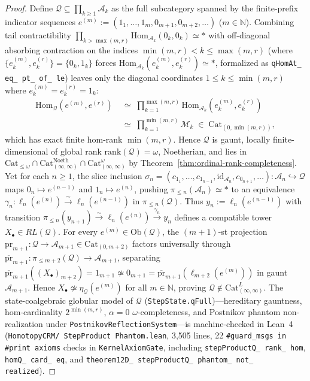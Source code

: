 \begin{proof}
Define $\mathcal{Q} \subseteq \prod_{k \ge 1} \mathcal{A}_k$ as the full subcategory spanned by the finite-prefix indicator sequences $e^{(m)} := (1_1, \dots, 1_m, 0_{m+1}, 0_{m+2}, \dots)$ ($m \in \mathbb{N}$). Combining tail contractibility $\prod_{k > \max(m, r)} \mathrm{Hom}_{\mathcal{A}_k}(0_k, 0_k) \simeq *$ with off-diagonal absorbing contraction on the indices $\min(m, r) < k \le \max(m, r)$ (where $\{e^{(m)}_k, e^{(r)}_k\} = \{0_k, 1_k\}$ forces $\mathrm{Hom}_{\mathcal{A}_k}(e^{(m)}_k, e^{(r)}_k) \simeq *$, formalized as \texttt{qHomAt\_ eq\_ pt\_ of\_ le}) leaves only the diagonal coordinates $1 \le k \le \min(m, r)$ where $e^{(m)}_k = e^{(r)}_k = 1_k$:
\[
  \begin{aligned}
    \mathrm{Hom}_{\mathcal{Q}}(e^{(m)}, e^{(r)}) &\;\simeq\; \prod_{k=1}^{\max(m, r)} \mathrm{Hom}_{\mathcal{A}_k}(e^{(m)}_k, e^{(r)}_k) \\
    &\;\simeq\; \prod_{k=1}^{\min(m, r)} \mathcal{M}_k \;\in\; \mathrm{Cat}_{(0, \min(m, r))},
  \end{aligned}
\]
which has exact finite hom-rank $\min(m, r)$. Hence $\mathcal{Q}$ is gaunt, locally finite-dimensional of global rank $\mathrm{rank}(\mathcal{Q}) = \omega$, Noetherian, and lies in $\mathrm{Cat}_{\le \omega} \cap \mathrm{Cat}^{\mathrm{Noeth}}_{(\infty, \infty)} \cap \mathrm{Cat}^\omega_{(\infty, \infty)}$ by Theorem~\ref{thm:ordinal-rank-completeness}. Yet for each $n \ge 1$, the slice inclusion $\sigma_n = (c_{1_1}, \dots, c_{1_{n-1}}, \mathrm{id}_{\mathcal{A}_n}, c_{0_{n+1}}, \dots) : \mathcal{A}_n \hookrightarrow \mathcal{Q}$ maps $0_n \mapsto e^{(n-1)}$ and $1_n \mapsto e^{(n)}$, pushing $\pi_{\le n}(\mathcal{A}_n) \simeq *$ to an equivalence $\gamma_n : \ell_n(e^{(n)}) \xrightarrow{\sim} \ell_n(e^{(n-1)})$ in $\pi_{\le n}(\mathcal{Q})$. Thus $y_n := \ell_n(e^{(n-1)})$ with transition $\pi_{\le n}(y_{n+1}) \xrightarrow{\sim} \ell_n(e^{(n)}) \xrightarrow{\gamma_n} y_n$ defines a compatible tower $X_\bullet \in RL(\mathcal{Q})$. For every $e^{(m)} \in \mathrm{Ob}(\mathcal{Q})$, the $(m+1)$-st projection $\mathrm{pr}_{m+1} : \mathcal{Q} \to \mathcal{A}_{m+1} \in \mathrm{Cat}_{(0, m+2)}$ factors universally through $\overline{\mathrm{pr}}_{m+1} : \pi_{\le m+2}(\mathcal{Q}) \to \mathcal{A}_{m+1}$, separating $\overline{\mathrm{pr}}_{m+1}((X_\bullet)_{m+2}) = 1_{m+1} \not\simeq 0_{m+1} = \overline{\mathrm{pr}}_{m+1}(\ell_{m+2}(e^{(m)}))$ in gaunt $\mathcal{A}_{m+1}$. Hence $X_\bullet \not\simeq \eta_{\mathcal{Q}}(e^{(m)})$ for all $m \in \mathbb{N}$, proving $\mathcal{Q} \notin \mathrm{Cat}^L_{(\infty, \infty)}$. The state-coalgebraic globular model of $\mathcal{Q}$ (\texttt{StepState.qFull})---hereditary gauntness, hom-cardinality $2^{\min(m,r)}$, $\alpha = 0$ $\omega$-completeness, and Postnikov phantom non-realization under \texttt{PostnikovReflectionSystem}---is machine-checked in Lean~4 (\texttt{HomotopyCRM/ StepProduct Phantom.lean}, 3,505 lines, 22 \texttt{\#guard\_msgs in \#print axioms} checks in \texttt{KernelAxiomGate}, including \texttt{stepProductQ\_ rank\_ hom}, \texttt{homQ\_ card\_ eq}, and \texttt{theorem12D\_ stepProductQ\_ phantom\_ not\_ realized}).
\end{proof}

